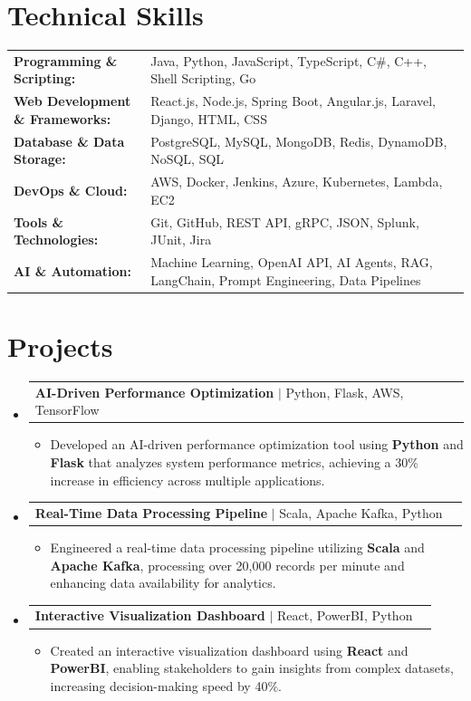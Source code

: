 \documentclass[letterpaper,10pt]{article}
\makeatletter
\newcommand{\resumeItem}[1]{
  \item{\fontsize{8pt}{9pt}\selectfont
    #1 \vspace{-3pt}
  }
}
\newcommand{\resumeProjectHeading}[2]{
    \item
    \begin{tabular*}{1.001\textwidth}{l@{\extracolsep{\fill}}r}
      \fontsize{8.5pt}{10pt}#1 & \textbf{\fontsize{8.5pt}{10pt} #2}\\
    \end{tabular*}\vspace{-7pt}
}
\newcommand{\resumeSubHeadingListStart}{\begin{itemize}[leftmargin=0pt, label={}]}
\newcommand{\resumeSubHeadingListEnd}{\end{itemize}}
\newcommand{\resumeItemListStart}{\begin{itemize}[leftmargin=*]}
\newcommand{\resumeItemListEnd}{\end{itemize}\vspace{-5pt}}
\makeatother
\begin{document}
\section{Technical Skills}
        \vspace{-14pt}
        \begin{table}[h]
            \fontsize{8pt}{9pt}\selectfont
            \begin{tabular}{p{0.3\linewidth} p{0.7\linewidth}}
                \textbf{Programming \& Scripting:} & Java, Python, JavaScript, TypeScript, C\#, C++, Shell Scripting, Go \\
                \textbf{Web Development \& Frameworks:} & React.js, Node.js, Spring Boot, Angular.js, Laravel, Django, HTML, CSS \\
                \textbf{Database \& Data Storage:} & PostgreSQL, MySQL, MongoDB, Redis, DynamoDB, NoSQL, SQL \\
                \textbf{DevOps \& Cloud:} & AWS, Docker, Jenkins, Azure, Kubernetes, Lambda, EC2 \\
                \textbf{Tools \& Technologies:} & Git, GitHub, REST API, gRPC, JSON, Splunk, JUnit, Jira \\
                \textbf{AI \& Automation:} & Machine Learning, OpenAI API, AI Agents, RAG, LangChain, Prompt Engineering, Data Pipelines \\
            \end{tabular}
        \end{table}
 \vspace{-18pt}

\section{Projects}
    \vspace{-5pt}
    \resumeSubHeadingListStart
          \resumeProjectHeading
            {\textbf{AI-Driven Performance Optimization} $|$ Python, Flask, AWS, TensorFlow}{}
            \resumeItemListStart
                \resumeItem{Developed an AI-driven performance optimization tool using \textbf{Python} and \textbf{Flask} that analyzes system performance metrics, achieving a 30\% increase in efficiency across multiple applications.}
            \resumeItemListEnd
        \vspace{-12pt}
    
        \resumeProjectHeading
            {\textbf{Real-Time Data Processing Pipeline} $|$ Scala, Apache Kafka, Python}{}
        \resumeItemListStart
                \resumeItem{Engineered a real-time data processing pipeline utilizing \textbf{Scala} and \textbf{Apache Kafka}, processing over 20,000 records per minute and enhancing data availability for analytics.}
        \resumeItemListEnd
      \vspace{-12pt}
      \resumeProjectHeading
        {\textbf{Interactive Visualization Dashboard} $|$ React, PowerBI, Python}{}
    \resumeItemListStart
            \resumeItem{Created an interactive visualization dashboard using \textbf{React} and \textbf{PowerBI}, enabling stakeholders to gain insights from complex datasets, increasing decision-making speed by 40\%.}
    \resumeItemListEnd
    \resumeSubHeadingListEnd
\end{document}
